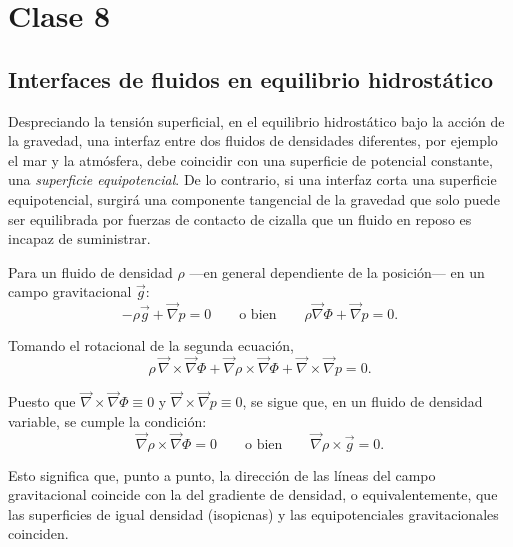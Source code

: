 \shorthandoff{<>}











\shorthandon{<>}

\chapter{Clase 8}

\section{Interfaces de fluidos en equilibrio hidrostático}

Despreciando la tensión superficial, en el equilibrio hidrostático bajo la acción de la gravedad, una interfaz entre dos fluidos de densidades diferentes, por ejemplo el mar y la atmósfera, debe coincidir con una superficie de potencial constante, una \emph{superficie equipotencial}. De lo contrario, si una interfaz corta una superficie equipotencial, surgirá una componente tangencial de la gravedad que solo puede ser equilibrada por fuerzas de contacto de cizalla que un fluido en reposo es incapaz de suministrar.

Para un fluido de densidad $\rho$ —en general dependiente de la posición— en un campo gravitacional $\vec{g}$:
$$ -\rho\vec{g} + \vec{\nabla}p = 0 \qquad \text{o bien} \qquad \rho\vec{\nabla}\Phi + \vec{\nabla}p = 0. $$

Tomando el rotacional de la segunda ecuación,
$$ \rho\,\vec{\nabla}\times\vec{\nabla}\Phi + \vec{\nabla}\rho\times\vec{\nabla}\Phi + \vec{\nabla}\times\vec{\nabla}p = 0. $$

Puesto que $\vec{\nabla}\times\vec{\nabla}\Phi \equiv 0$ y $\vec{\nabla}\times\vec{\nabla}p \equiv 0$, se sigue que, en un fluido de densidad variable, se cumple la condición:
$$ \vec{\nabla}\rho\times\vec{\nabla}\Phi = 0 \qquad \text{o bien} \qquad \vec{\nabla}\rho\times\vec{g} = 0. $$

Esto significa que, punto a punto, la dirección de las líneas del campo gravitacional coincide con la del gradiente de densidad, o equivalentemente, que las superficies de igual densidad (isopicnas) y las equipotenciales gravitacionales coinciden.

